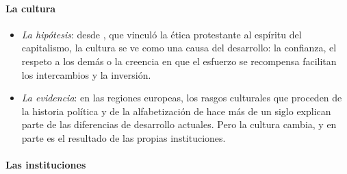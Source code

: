 \documentclass[11pt]{article}
\begin{document}
\paragraph{La cultura}

\begin{itemize}
\item \emph{La hipótesis}: desde \textcite{Weber1905}, que vinculó la ética protestante al espíritu del capitalismo, la cultura se ve como una causa del desarrollo: la confianza, el respeto a los demás o la creencia en que el esfuerzo se recompensa facilitan los intercambios y la inversión\nocite{GuisoSapienzaZingales2006}.
\item \emph{La evidencia}: en las regiones europeas, los rasgos culturales que proceden de la historia política y de la alfabetización de hace más de un siglo explican parte de las diferencias de desarrollo actuales\nocite{Tabellini2010}. Pero la cultura cambia, y en parte es el resultado de las propias instituciones.
\end{itemize}

\paragraph{Las instituciones}
\end{document}
